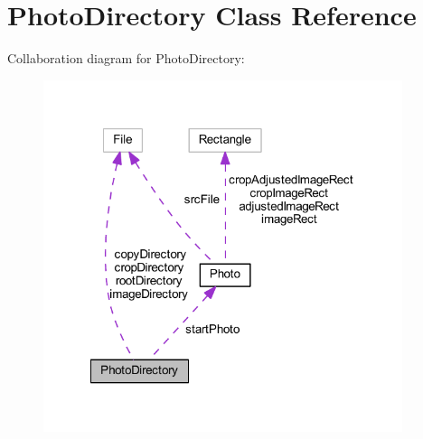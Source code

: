 \hypertarget{class_photo_directory}{\section{Photo\-Directory Class Reference}
\label{class_photo_directory}
}


Collaboration diagram for Photo\-Directory\-:
\nopagebreak
\begin{figure}[H]
\begin{center}
\leavevmode
\includegraphics[width=298pt]{class_photo_directory__coll__graph}
\end{center}
\end{figure}
